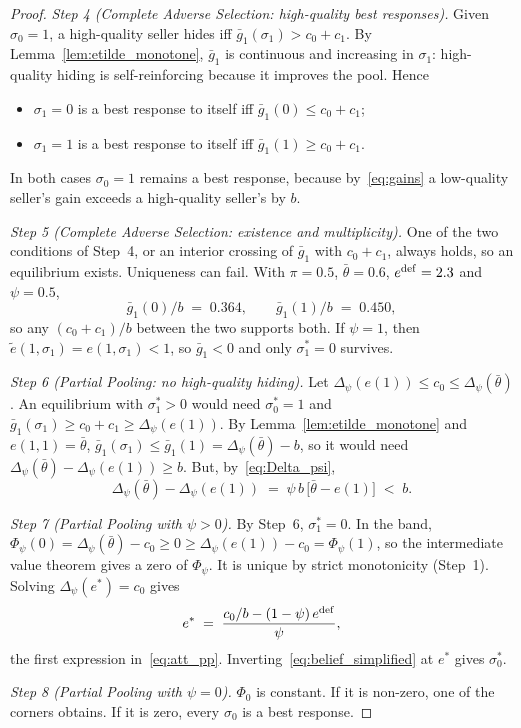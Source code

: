 \begin{proof}
\emph{Step 4 (Complete Adverse Selection: high-quality best responses).} Given $\sigma_0=1$, a high-quality seller hides iff $\bar g_1(\sigma_1)>c_0+c_1$. By Lemma~\ref{lem:etilde_monotone}, $\bar g_1$ is continuous and increasing in $\sigma_1$: high-quality hiding is self-reinforcing because it improves the pool. Hence
\begin{itemize}
    \item $\sigma_1=0$ is a best response to itself iff $\bar g_1(0)\le c_0+c_1$;
    \item $\sigma_1=1$ is a best response to itself iff $\bar g_1(1)\ge c_0+c_1$.
\end{itemize}
In both cases $\sigma_0=1$ remains a best response, because by~\eqref{eq:gains} a low-quality seller's gain exceeds a high-quality seller's by $b$.

\emph{Step 5 (Complete Adverse Selection: existence and multiplicity).} One of the two conditions of Step~4, or an interior crossing of $\bar g_1$ with $c_0+c_1$, always holds, so an equilibrium exists. Uniqueness can fail. With $\pi=0.5$, $\bar\theta=0.6$, $e^{\rm def}=2.3$ and $\psi=0.5$,
\begin{equation*}
    \bar g_1(0)/b\;=\;0.364,\qquad\bar g_1(1)/b\;=\;0.450,
\end{equation*}
so any $(c_0+c_1)/b$ between the two supports both. If $\psi=1$, then $\tilde e(1,\sigma_1)=e(1,\sigma_1)<1$, so $\bar g_1<0$ and only $\sigma_1^*=0$ survives.

\emph{Step 6 (Partial Pooling: no high-quality hiding).} Let $\Delta_\psi(e(1))\le c_0\le\Delta_\psi(\bar\theta)$. An equilibrium with $\sigma_1^*>0$ would need $\sigma_0^*=1$ and $\bar g_1(\sigma_1)\ge c_0+c_1\ge\Delta_\psi(e(1))$. By Lemma~\ref{lem:etilde_monotone} and $e(1,1)=\bar\theta$, $\bar g_1(\sigma_1)\le\bar g_1(1)=\Delta_\psi(\bar\theta)-b$, so it would need $\Delta_\psi(\bar\theta)-\Delta_\psi(e(1))\ge b$. But, by~\eqref{eq:Delta_psi},
\begin{equation*}
    \Delta_\psi(\bar\theta)-\Delta_\psi(e(1))\;=\;\psi\,b\,\big[\bar\theta-e(1)\big]\;<\;b.
\end{equation*}

\emph{Step 7 (Partial Pooling with $\psi>0$).} By Step~6, $\sigma_1^*=0$. In the band, $\Phi_\psi(0)=\Delta_\psi(\bar\theta)-c_0\ge0\ge\Delta_\psi(e(1))-c_0=\Phi_\psi(1)$, so the intermediate value theorem gives a zero of $\Phi_\psi$. It is unique by strict monotonicity (Step~1). Solving $\Delta_\psi(e^*)=c_0$ gives
\begin{equation*}
    e^*\;=\;\frac{c_0/b-(1-\psi)\,e^{\rm def}}{\psi},
\end{equation*}
the first expression in~\eqref{eq:att_pp}. Inverting~\eqref{eq:belief_simplified} at $e^*$ gives $\sigma_0^*$.

\emph{Step 8 (Partial Pooling with $\psi=0$).} $\Phi_0$ is constant. If it is non-zero, one of the corners obtains. If it is zero, every $\sigma_0$ is a best response.
\end{proof}

